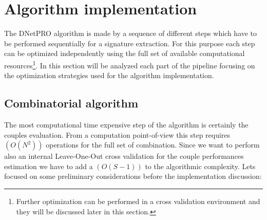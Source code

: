 \documentclass{standalone}
\begin{document}
\section[DNetPRO Implementation]{Algorithm implementation}\label{implementation}

The DNetPRO algorithm is made by a sequence of different steps which have to be performed sequentially for a signature extraction.
For this purpose each step can be optimized independently using the full set of available computational resources\footnote{
Further optimization can be performed in a cross validation environment and they will be discussed later in this section.
}.
In this section will be analyzed each part of the pipeline focusing on the optimization strategies used for the algorithm implementation.


\subsection[Pairs evaluation]{Combinatorial algorithm}\label{implementation:couples}

The most computational time expensive step of the algorithm is certainly the couples evaluation.
From a computation point-of-view this step requires $(O(N^2))$ operations for the full set of combination.
Since we want to perform also an internal Leave-One-Out cross validation for the couple performances estimation we have to add a $(O(S-1))$ to the algorithmic complexity.
Lets focused on some preliminary considerations before the implementation discussion:
\end{document}
